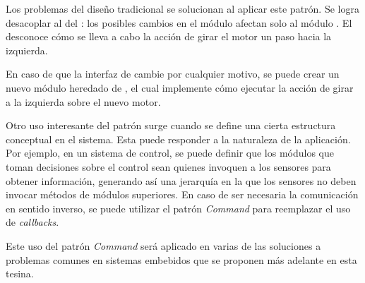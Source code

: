 Los problemas del diseño tradicional se solucionan al aplicar este patrón. Se logra desacoplar al \Motor del \Controller: los posibles cambios en el módulo \Motor afectan solo al módulo \MotorGirarIzq. El \Controller desconoce cómo se lleva a cabo la acción de girar el motor un paso hacia la izquierda.

En caso de que la interfaz de \Motor cambie por cualquier motivo, se puede crear un nuevo módulo heredado de \Orden, el cual implemente cómo ejecutar la acción de girar a la izquierda sobre el nuevo motor.

Otro uso interesante del patrón surge cuando se define una cierta estructura conceptual en el sistema. Esta puede responder a la naturaleza de la aplicación. Por ejemplo, en un sistema de control, se puede definir que los módulos que toman decisiones sobre el control sean quienes invoquen a los sensores para obtener información, generando así una jerarquía en la que los sensores no deben invocar métodos de módulos superiores. En caso de ser necesaria la comunicación en sentido inverso, se puede utilizar el patrón \textit{Command} para reemplazar el uso de \textit{callbacks}.

Este uso del patrón \textit{Command} será aplicado en varias de las soluciones a problemas comunes en sistemas embebidos que se proponen más adelante en esta tesina.